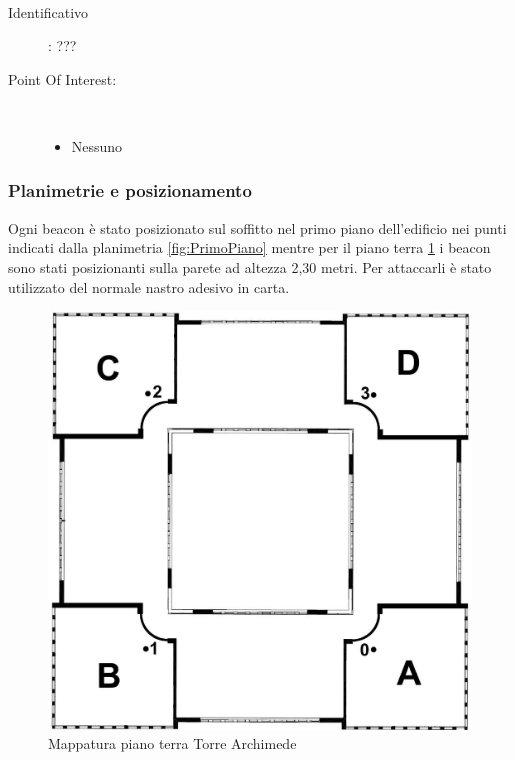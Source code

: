 \documentclass[../SperimentazioniPratiche.tex]{subfiles}
\begin{document}
			\paragraph*{}
			\label{01007}
			\begin{tcolorbox}[fonttitle=\bfseries, 
								adjusted title={\Large Beacon 01007},
								sharp corners=south,
								colback=white, 
								colframe=white!50!blue!75!black]
								
				\begin{description}
					\item[Identificativo]: ???

					\tcbline					
					
					\item[Point Of Interest:] \ \par
					\begin{itemize}
						\item Nessuno
					\end{itemize}					   				
				\end{description}  				
			\end{tcolorbox}
			
		
		
		\newpage
		\subsubsection{Planimetrie e posizionamento}
			Ogni beacon è stato posizionato sul soffitto nel primo piano dell'edificio nei punti indicati dalla planimetria \ref{fig:PrimoPiano} mentre per il piano terra \ref{fig:PianoTerra} i beacon sono stati posizionanti sulla parete ad altezza 2,30 metri. Per attaccarli è stato utilizzato del normale nastro adesivo in carta.
			
			\begin{figure}[h]
				\includegraphics[width=\textwidth]{img/PianoTerra}
				\caption{Mappatura piano terra Torre Archimede}
				\label{fig:PianoTerra}
			\end{figure}						
\end{document}
